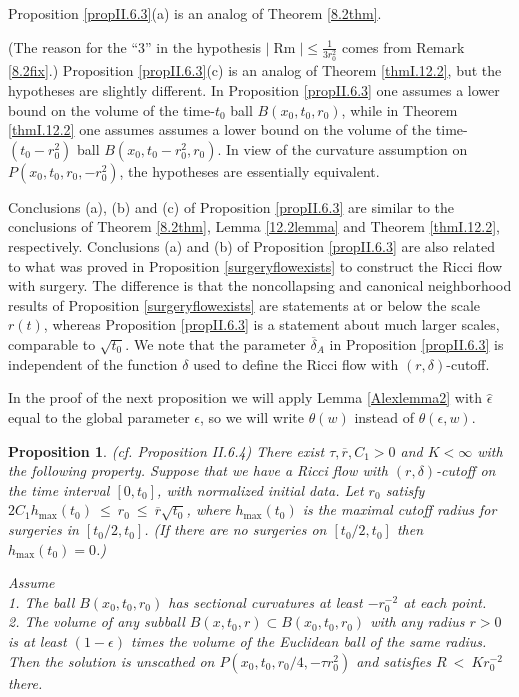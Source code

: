 \documentclass[12pt]{amsart}
\newcommand{\Rm}{\operatorname{Rm}}
\numberwithin{equation}{section}
\theoremstyle{plain}
\newtheorem{proposition}[equation]{Proposition}
\theoremstyle{definition}
\theoremstyle{remark}
\begin{document}
Proposition \ref{propII.6.3}(a) is an analog of Theorem 
\ref{8.2thm}.

(The reason for the ``$3$'' in the hypothesis 
$|\Rm| \le \frac{1}{3r_0^2}$ comes from Remark \ref{8.2fix}.)
Proposition \ref{propII.6.3}(c) is an analog of Theorem
\ref{thmI.12.2}, but the hypotheses are slightly different.
In Proposition \ref{propII.6.3} one assumes a lower bound on the volume of the
time-$t_0$ ball $B(x_0, t_0, r_0)$, while in Theorem \ref{thmI.12.2}
one assumes assumes a lower bound on the volume of
the time-$(t_0 - r_0^2)$ ball $B(x_0, t_0 - r_0^2, r_0)$. In
view of the curvature assumption on $P(x_0, t_0, r_0, - r_0^2)$,
the hypotheses are 
essentially
equivalent.


Conclusions (a), (b) and (c) of Proposition \ref{propII.6.3}
are similar to the conclusions of Theorem \ref{8.2thm},
Lemma \ref{12.2lemma} and Theorem \ref{thmI.12.2}, respectively.
Conclusions (a) and (b) of Proposition \ref{propII.6.3}
are also related
to what was proved in Proposition \ref{surgeryflowexists} to construct the 
Ricci flow with surgery. The difference
is that the noncollapsing and canonical neighborhood results of Proposition 
\ref{surgeryflowexists}
are statements at or below the scale $r(t)$, whereas Proposition \ref{propII.6.3}
is a statement about much larger scales, comparable to $\sqrt{t_0}$.
We note that the parameter $\overline{\delta}_A$ in
Proposition \ref{propII.6.3} is independent of the function $\delta$
used to define the Ricci flow with $(r, \delta)$-cutoff.


In the proof of the next proposition we will apply Lemma \ref{Alexlemma2} with
$\widehat{\epsilon}$ equal to the global parameter $\epsilon$,
so we will write $\theta(w)$ instead of $\theta(\epsilon, w)$.


\begin{proposition} \label{propII.6.4}
(cf. Proposition II.6.4)
There exist $\tau, \overline{r}, C_1 > 0$ and $K < \infty$ with the
following property. Suppose that we have a Ricci flow with $(r, \delta)$-cutoff
on the time interval $[0, t_0]$, with normalized initial data.
  Let $r_0$ satisfy 
$2C_1 h_{\max}(t_0) \: \le \: r_0 \: \le \: \overline{r} \sqrt{t_0}$,
where $h_{\max}(t_0)$ is the maximal cutoff radius for surgeries in 
$[t_0/2, t_0]$. (If there are no surgeries on $[t_0/2, t_0]$ then 
$h_{\max}(t_0) = 0$.)

Assume \\
1. The ball $B(x_0, t_0, r_0)$ has sectional curvatures at least $- r_0^{-2}$
at each point. \\
2. The volume of any subball $B(x, t_0, r) \subset B(x_0, t_0, r_0)$ with
any radius $r > 0$ is at least $(1-\epsilon)$ times the volume of the
Euclidean ball of the same radius.\\

Then the solution is unscathed on
$P(x_0, t_0, r_0/4, - \tau r_0^2)$
and satisfies $R \: < \: K r_0^{-2}$ there.
\end{proposition}
\end{document}

